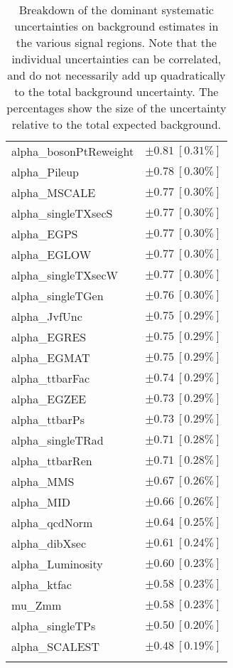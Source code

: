 \begin{table}
\begin{center}
\begin{tabular*}{\textwidth}{@{\extracolsep{\fill}}lc}
alpha\_bosonPtReweight         & $\pm 0.81\ [0.31\%] $       \\
alpha\_Pileup         & $\pm 0.78\ [0.30\%] $       \\
alpha\_MSCALE         & $\pm 0.77\ [0.30\%] $       \\
alpha\_singleTXsecS         & $\pm 0.77\ [0.30\%] $       \\
alpha\_EGPS         & $\pm 0.77\ [0.30\%] $       \\
alpha\_EGLOW         & $\pm 0.77\ [0.30\%] $       \\
alpha\_singleTXsecW         & $\pm 0.77\ [0.30\%] $       \\
alpha\_singleTGen         & $\pm 0.76\ [0.30\%] $       \\
alpha\_JvfUnc         & $\pm 0.75\ [0.29\%] $       \\
alpha\_EGRES         & $\pm 0.75\ [0.29\%] $       \\
alpha\_EGMAT         & $\pm 0.75\ [0.29\%] $       \\
alpha\_ttbarFac         & $\pm 0.74\ [0.29\%] $       \\
alpha\_EGZEE         & $\pm 0.73\ [0.29\%] $       \\
alpha\_ttbarPs         & $\pm 0.73\ [0.29\%] $       \\
alpha\_singleTRad         & $\pm 0.71\ [0.28\%] $       \\
alpha\_ttbarRen         & $\pm 0.71\ [0.28\%] $       \\
alpha\_MMS         & $\pm 0.67\ [0.26\%] $       \\
alpha\_MID         & $\pm 0.66\ [0.26\%] $       \\
alpha\_qcdNorm         & $\pm 0.64\ [0.25\%] $       \\
alpha\_dibXsec         & $\pm 0.61\ [0.24\%] $       \\
alpha\_Luminosity         & $\pm 0.60\ [0.23\%] $       \\
alpha\_ktfac         & $\pm 0.58\ [0.23\%] $       \\
mu\_Zmm         & $\pm 0.58\ [0.23\%] $       \\
alpha\_singleTPs         & $\pm 0.50\ [0.20\%] $       \\
alpha\_SCALEST         & $\pm 0.48\ [0.19\%] $       \\
\noalign{\smallskip}\hline\noalign{\smallskip}
\end{tabular*}
\end{center}
\caption[Breakdown of uncertainty on background estimates]{
Breakdown of the dominant systematic uncertainties on background estimates in the various signal regions.
Note that the individual uncertainties can be correlated, and do not necessarily add up quadratically to 
the total background uncertainty. The percentages show the size of the uncertainty relative to the total expected background.
\label{table.results.bkgestimate.uncertainties.SR}}
\end{table}
%